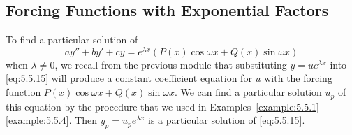 \documentclass{ximera}
\begin{document}
 
 
\subsection*{Forcing Functions with Exponential Factors}
 
To find a particular solution of
\begin{equation} \label{eq:5.5.15}
ay''+by'+cy=e^{\lambda x}\left(P(x)\cos \omega x+Q(x)\sin \omega x\right)
\end{equation}
when $\lambda\neq 0$, we recall from the previous module that
substituting $y=ue^{\lambda x}$ into \eqref{eq:5.5.15} will produce a
constant coefficient equation for $u$  with  the forcing
function  $P(x)\cos \omega x+Q(x)\sin \omega x$. We can find a
particular solution $u_p$ of this equation by the procedure that we
used in Examples~\ref{example:5.5.1}--\ref{example:5.5.4}. Then
$y_p=u_pe^{\lambda x}$ is a particular solution of \eqref{eq:5.5.15}.
 
\end{document}
